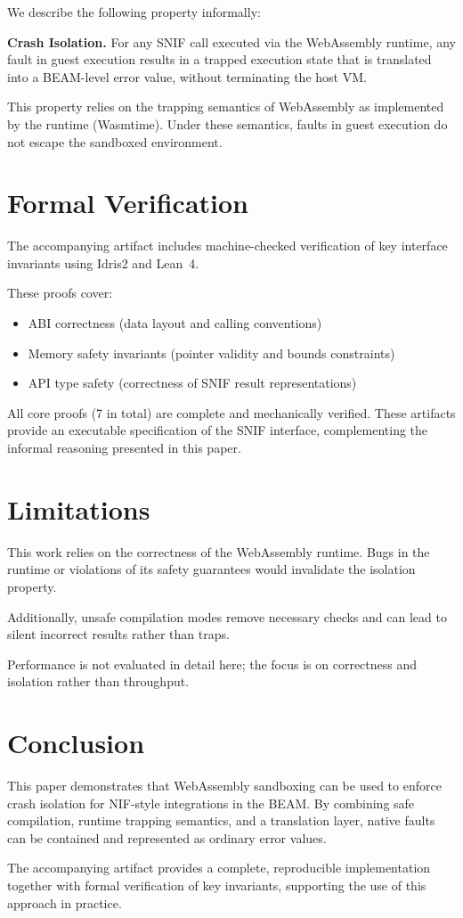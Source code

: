 \documentclass{article}
\begin{document}
We describe the following property informally:

\textbf{Crash Isolation.} For any SNIF call executed via the WebAssembly runtime, any fault in guest execution results in a trapped execution state that is translated into a BEAM-level error value, without terminating the host VM.

This property relies on the trapping semantics of WebAssembly as implemented by the runtime (Wasmtime). Under these semantics, faults in guest execution do not escape the sandboxed environment.

\section{Formal Verification}

The accompanying artifact includes machine-checked verification of key interface invariants using Idris2 and Lean~4.

These proofs cover:

\begin{itemize}
  \item ABI correctness (data layout and calling conventions)
  \item Memory safety invariants (pointer validity and bounds constraints)
  \item API type safety (correctness of SNIF result representations)
\end{itemize}

All core proofs (7 in total) are complete and mechanically verified. These artifacts provide an executable specification of the SNIF interface, complementing the informal reasoning presented in this paper.

\section{Limitations}

This work relies on the correctness of the WebAssembly runtime. Bugs in the runtime or violations of its safety guarantees would invalidate the isolation property.

Additionally, unsafe compilation modes remove necessary checks and can lead to silent incorrect results rather than traps.

Performance is not evaluated in detail here; the focus is on correctness and isolation rather than throughput.

\section{Conclusion}

This paper demonstrates that WebAssembly sandboxing can be used to enforce crash isolation for NIF-style integrations in the BEAM. By combining safe compilation, runtime trapping semantics, and a translation layer, native faults can be contained and represented as ordinary error values.

The accompanying artifact provides a complete, reproducible implementation together with formal verification of key invariants, supporting the use of this approach in practice.



\end{document}
